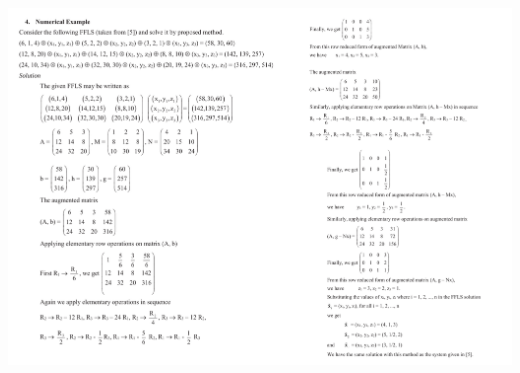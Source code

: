 \documentclass[9pt,aspectratio=169]{beamer}
\begin{document}
\begin{frame}{}
    \includegraphics[scale=0.4]{images/gaussjordan-fuzzy.pdf}
\end{frame}
\end{document}
